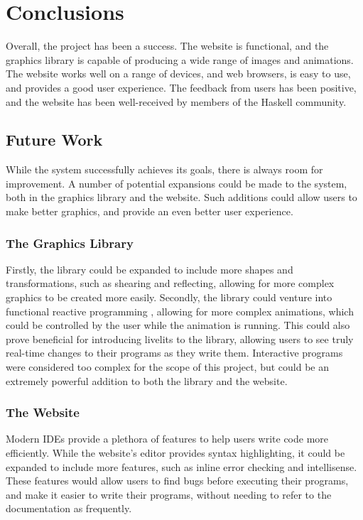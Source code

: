 \documentclass[../main.tex]{subfiles}
\begin{document}
\chapter{Conclusions} \label{ch:conclusions}
    Overall, the project has been a success.
    The website is functional, and the graphics library is capable of producing a
        wide range of images and animations.
    The website works well on a range of devices, and web browsers, is easy to use,
        and provides a good user experience.
    The feedback from users has been positive, and the website has been
        well-received by members of the Haskell community.

    \section{Future Work}
        While the system successfully achieves its goals, there is always room for
            improvement.
        A number of potential expansions could be made to the system, both in the
            graphics library and the website.
        Such additions could allow users to make better graphics, and provide an even
            better user experience.

        \subsection{The Graphics Library}
            Firstly, the library could be expanded to include more shapes and
                transformations, such as shearing and reflecting, allowing for more complex
                graphics to be created more easily.
            Secondly, the library could venture into functional reactive programming
                \citep{frp}, allowing for more complex animations, which could be controlled by
                the user while the animation is running.
            This could also prove beneficial for introducing livelits to the library,
                allowing users to see truly real-time changes to their programs as they write
                them.
            Interactive programs were considered too complex for the scope of this project,
                but could be an extremely powerful addition to both the library and the
                website.

        \subsection{The Website}
            Modern IDEs provide a plethora of features to help users write code more
                efficiently.
            While the website's editor provides syntax highlighting, it could be expanded
                to include more features, such as inline error checking and intellisense.
            These features would allow users to find bugs before executing their programs,
                and make it easier to write their programs, without needing to refer to the
                documentation as frequently.
\end{document}
